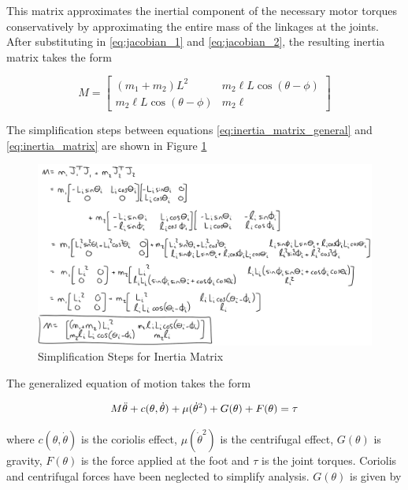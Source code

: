 This matrix approximates the inertial component of the necessary motor torques conservatively by approximating the entire mass of the linkages at the joints.
After substituting in \ref{eq:jacobian_1} and \ref{eq:jacobian_2}, the resulting inertia matrix takes the form

\begin{equation} \label{eq:inertia_matrix}
    M = \begin{bmatrix} 
        (m_1 + m_2) L^2 & m_2 \ell L \cos(\theta-\phi) \\
        m_2 \ell L \cos(\theta-\phi) & m_2 \ell
        \end{bmatrix}
\end{equation}

The simplification steps between equations \ref{eq:inertia_matrix_general} and \ref{eq:inertia_matrix} are shown in Figure \ref{fig:inertia_matrix_simplification}

\begin{figure}[H]
    \centering
    \includegraphics[width=\textwidth]{7_Appendices/img/too_much_math_to_write.png}
    \caption{Simplification Steps for Inertia Matrix}
    \label{fig:inertia_matrix_simplification}
\end{figure}

The generalized equation of motion takes the form

\begin{equation} \label{eq:dynamic_general}
    M\Ddot{\theta} + c(\theta,\dot{\theta}) + \mu (\dot{\theta}^2) + G(\theta) + F(\theta) = \tau
\end{equation}

where $c(\theta,\dot{\theta})$ is the coriolis effect, $\mu (\dot{\theta}^2)$ is the centrifugal effect, $G(\theta)$ is gravity, $F(\theta)$ is the force applied at the foot and $\tau$ is the joint torques.
Coriolis and centrifugal forces have been neglected to simplify analysis.
$G(\theta)$ is given by

